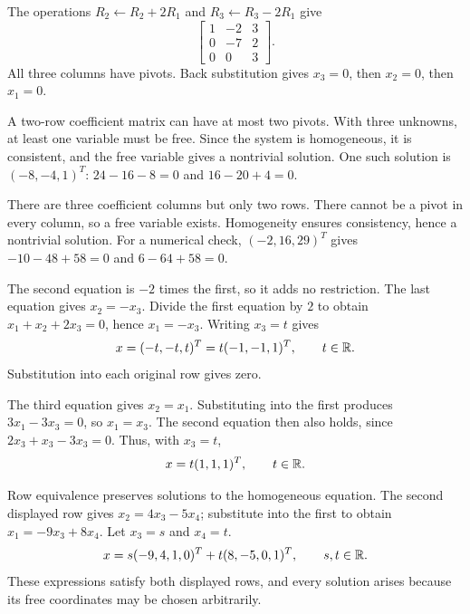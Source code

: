 The operations $R_2\leftarrow R_2+2R_1$ and
$R_3\leftarrow R_3-2R_1$ give
\[\begin{bmatrix}1&-2&3\\0&-7&2\\0&0&3\end{bmatrix}.\]
All three columns have pivots. Back substitution gives $x_3=0$,
then $x_2=0$, then $x_1=0$.

A two-row coefficient matrix can have at most two pivots. With
three unknowns, at least one variable must be free. Since the system
is homogeneous, it is consistent, and the free variable gives a
nontrivial solution. One such solution is $(-8,-4,1)^T$:
$24-16-8=0$ and $16-20+4=0$.

There are three coefficient columns but only two rows. There cannot
be a pivot in every column, so a free variable exists. Homogeneity
ensures consistency, hence a nontrivial solution.
For a numerical check, $(-2,16,29)^T$ gives
$-10-48+58=0$ and $6-64+58=0$.

The second equation is $-2$ times the first, so it adds no restriction.
The last equation gives $x_2=-x_3$. Divide the first equation by $2$
to obtain $x_1+x_2+2x_3=0$, hence $x_1=-x_3$.
Writing $x_3=t$ gives
\[x=(-t,-t,t)^T=t(-1,-1,1)^T,\qquad t\in\mathbb{R}.\]
Substitution into each original row gives zero.

The third equation gives $x_2=x_1$. Substituting into the first
produces $3x_1-3x_3=0$, so $x_1=x_3$. The second equation then
also holds, since $2x_3+x_3-3x_3=0$.
Thus, with $x_3=t$,
\[x=t(1,1,1)^T,\qquad t\in\mathbb{R}.\]

Row equivalence preserves solutions to the homogeneous equation.
The second displayed row gives $x_2=4x_3-5x_4$; substitute into the
first to obtain $x_1=-9x_3+8x_4$. Let $x_3=s$ and $x_4=t$.
\[x=s(-9,4,1,0)^T+t(8,-5,0,1)^T,\qquad s,t\in\mathbb{R}.\]
These expressions satisfy both displayed rows, and every solution
arises because its free coordinates may be chosen arbitrarily.

